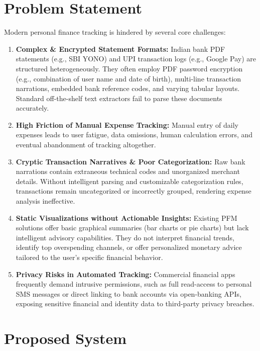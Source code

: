 \documentclass[../Project-Report-Main.tex]{subfiles}
\begin{document}
\section{Problem Statement}

Modern personal finance tracking is hindered by several core challenges:

\begin{enumerate}
 \item \textbf{Complex \& Encrypted Statement Formats:} Indian bank PDF statements (e.g., SBI YONO) and UPI transaction logs (e.g., Google Pay) are structured heterogeneously. They often employ PDF password encryption (e.g., combination of user name and date of birth), multi-line transaction narrations, embedded bank reference codes, and varying tabular layouts. Standard off-the-shelf text extractors fail to parse these documents accurately.

 \item \textbf{High Friction of Manual Expense Tracking:} Manual entry of daily expenses leads to user fatigue, data omissions, human calculation errors, and eventual abandonment of tracking altogether.

 \item \textbf{Cryptic Transaction Narratives \& Poor Categorization:} Raw bank narrations contain extraneous technical codes and unorganized merchant details. Without intelligent parsing and customizable categorization rules, transactions remain uncategorized or incorrectly grouped, rendering expense analysis ineffective.

 \item \textbf{Static Visualizations without Actionable Insights:} Existing PFM solutions offer basic graphical summaries (bar charts or pie charts) but lack intelligent advisory capabilities. They do not interpret financial trends, identify top overspending channels, or offer personalized monetary advice tailored to the user's specific financial behavior.

 \item \textbf{Privacy Risks in Automated Tracking:} Commercial financial apps frequently demand intrusive permissions, such as full read-access to personal SMS messages or direct linking to bank accounts via open-banking APIs, exposing sensitive financial and identity data to third-party privacy breaches.
\end{enumerate}

\section{Proposed System}
\end{document}
